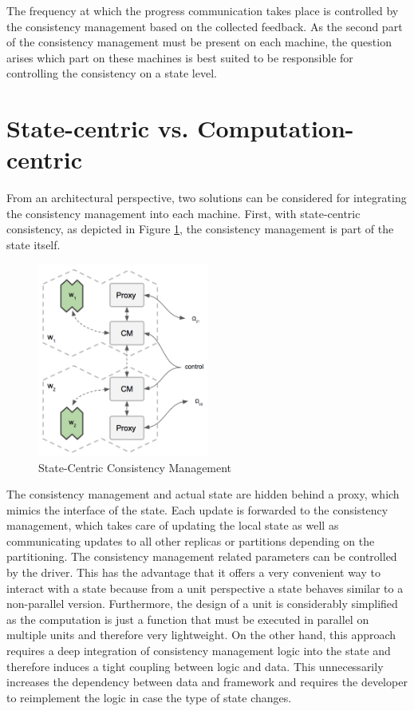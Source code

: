 The frequency at which the progress communication takes place is controlled by the consistency management based on the collected feedback.
As the second part of the consistency management must be present on each machine, the question arises which part on these machines is best suited to be responsible for controlling the consistency on a state level.

\section{State-centric vs. Computation-centric}
\label{s:state_centric_comp_centric}
From an architectural perspective, two solutions can be considered for integrating the consistency management into each machine.
First, with state-centric consistency, as depicted in Figure \ref{fig:state_centric_consistency}, the consistency management is part of the state itself.
\begin{figure}[ht]
\centering
\includegraphics[width=0.5\textwidth]{img/state_centric_consist.png}
\caption{State-Centric Consistency Management}
\label{fig:state_centric_consistency}
\end{figure}
The consistency management and actual state are hidden behind a proxy, which mimics the interface of the state.
Each update is forwarded to the consistency management, which takes care of updating the local state as well as communicating updates to all other replicas or partitions depending on the partitioning.
The consistency management related parameters can be controlled by the driver.
This has the advantage that it offers a very convenient way to interact with a state because from a unit perspective a state behaves similar to a non-parallel version.
Furthermore, the design of a unit is considerably simplified as the computation is just a function that must be executed in parallel on multiple units and therefore very lightweight.
On the other hand, this approach requires a deep integration of consistency management logic into the state and therefore induces a tight coupling between logic and data.
This unnecessarily increases the dependency between data and framework and requires the developer to reimplement the logic in case the type of state changes.

